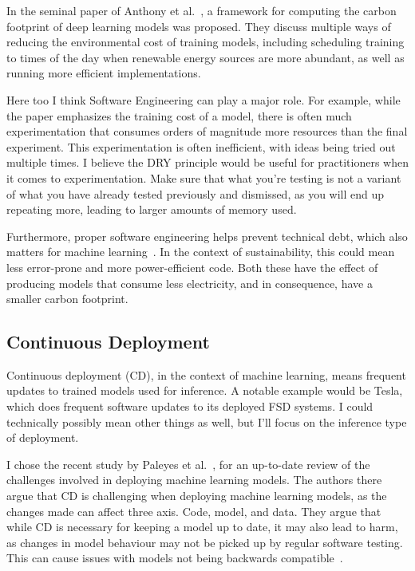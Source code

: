 \documentclass[11pt]{article}
\begin{document}
In the seminal paper of Anthony et al.~\cite{anthony2020carbontracker}, a framework for computing the carbon footprint of deep learning models was proposed. They discuss multiple ways of reducing the environmental cost of training models, including scheduling training to times of the day when renewable energy sources are more abundant, as well as running more efficient implementations.

Here too I think Software Engineering can play a major role. For example, while the paper emphasizes the training cost of a model, there is often much experimentation that consumes orders of magnitude more resources than the final experiment. This experimentation is often inefficient, with ideas being tried out multiple times. I believe the DRY principle would be useful for practitioners when it comes to experimentation. Make sure that what you're testing is not a variant of what you have already tested previously and dismissed, as you will end up repeating more, leading to larger amounts of memory used.

Furthermore, proper software engineering helps prevent technical debt, which also matters for machine learning~\cite{sculley2015hidden}. In the context of sustainability, this could mean less error-prone and more power-efficient code. Both these have the effect of producing models that consume less electricity, and in consequence, have a smaller carbon footprint.


\subsection{Continuous Deployment}
Continuous deployment (CD), in the context of machine learning, means frequent updates to trained models used for inference. A notable example would be Tesla, which does frequent software updates to its deployed FSD systems. I could technically possibly mean other things as well, but I'll focus on the inference type of deployment.

I chose the recent study by Paleyes et al.~\cite{paleyes2022challenges}, for an up-to-date review of the challenges involved in deploying machine learning models. The authors there argue that CD is challenging when deploying machine learning models, as the changes made can affect three axis. Code, model, and data. They argue that while CD is necessary for keeping a model up to date, it may also lead to harm, as changes in model behaviour may not be picked up by regular software testing. This can cause issues with models not being backwards compatible~\cite{srivastava2020empirical}.
\end{document}
